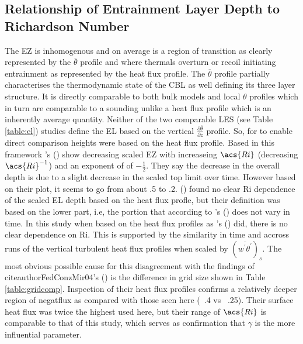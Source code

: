 \subsection{Relationship of Entrainment Layer Depth to Richardson Number}

The \acs{EZ} is inhomogenous and on average is a region of transition as clearly represented by the $\overline{\theta}$ profile
and where thermals overturn or recoil initiating entrainment as represented by the heat flux profile.  The $\overline{\theta}$ profile
partially characterises the thermodynamic state of the \acs{CBL} as well defining its three layer structure.  It is directly comparable to both bulk models and local $\theta$ profiles which in turn are comparable to a sounding unlike a heat flux profile which is an inherently average quantity.  Neither of the two comparable \acs{LES} (see Table \ref{table:el}) studies define the \acs{EL} based on the vertical $\frac{\partial \overline{\theta}}{\partial z}$ profile.  So, for to enable direct comparison heights were based on the heat flux profile.  Based in this framework \citeauthor{FedConzMir04}'s (\citeyear{FedConzMir04}) show decreasing scaled \acs{EZ} with increaseing $\acs{Ri }$ (decreasing $\acs{Ri}^{-1}$) and an exponent of of $-\frac{1}{2}$.  They say the decrease in the overall depth is due to a slight decrease in the scaled top limit over time.  However based on their plot, it seems to go from about .5 to .2. \citeauthor{BrooksFowler2} (\citeyear{BrooksFowler2}) found no clear \acs{Ri} dependence of the scaled \acs{EL} depth based on the heat flux profle, but their definition was based on the lower part, i.e, the portion that according to \citeauthor{FedConzMir04}'s (\citeyear{FedConzMir04}) does not vary in time.  In this study when based on the heat flux profiles as \citeauthor{FedConzMir04}'s (\citeyear{FedConzMir04}) did, there is no clear dependence on \acs{Ri}. This is supported by the similarity in time and accross runs of the vertical turbulent heat flux profiles when scaled by $(\overline{w^{'}\theta^{'}})_{s}$. The most obvious possible cause for this disagreement with the findings of citeauthor{FedConzMir04}'s (\citeyear{FedConzMir04}) is the difference in grid size shown in Table \ref{table:gridcomp}.  Inspection of their heat flux profiles confirms a relatively deeper region of negatflux as compared with those seen here (~.4 vs ~.25). Their surface heat flux was twice the highest used here, but their range of $\acs{Ri}$ is comparable to that of this study, which serves as confirmation that $\gamma$ is the more influential parameter.\\              

